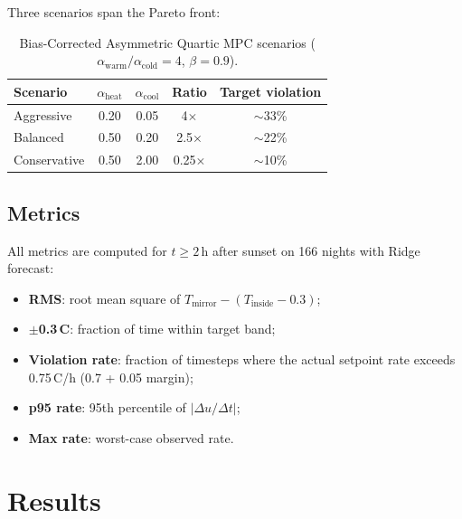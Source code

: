 \documentclass[11pt]{article}
\begin{document}
Three scenarios span the Pareto front:

\begin{table}[htbp]
\centering
\caption{Bias-Corrected Asymmetric Quartic MPC scenarios
  ($\alpha_\mathrm{warm}/\alpha_\mathrm{cold} = 4$, $\beta = 0.9$).}
\label{tab:mpc_scenarios}
\begin{tabular}{lcccc}
\toprule
Scenario & $\alpha_\mathrm{heat}$ & $\alpha_\mathrm{cool}$ & Ratio & Target violation \\
\midrule
Aggressive    & 0.20 & 0.05 & 4$\times$ & $\sim$33\% \\
Balanced      & 0.50 & 0.20 & 2.5$\times$ & $\sim$22\% \\
Conservative  & 0.50 & 2.00 & 0.25$\times$ & $\sim$10\% \\
\bottomrule
\end{tabular}
\end{table}

\subsection{Metrics}

All metrics are computed for $t \geq 2$\,h after sunset on 166 nights with
Ridge forecast:
\begin{itemize}
  \item \textbf{RMS}: root mean square of
    $T_\mathrm{mirror} - (T_\mathrm{inside} - 0.3)$;
  \item \textbf{$\pm$0.3\,\textdegree C}: fraction of time within target band;
  \item \textbf{Violation rate}: fraction of timesteps where the actual setpoint
    rate exceeds 0.75\,\textdegree C/h (0.7 + 0.05 margin);
  \item \textbf{p95 rate}: 95th percentile of $|\Delta u / \Delta t|$;
  \item \textbf{Max rate}: worst-case observed rate.
\end{itemize}

\section{Results}
\end{document}
